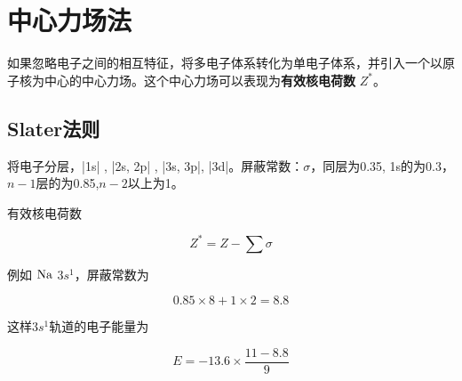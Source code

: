 \section{中心力场法}

如果忽略电子之间的相互特征，将多电子体系转化为单电子体系，并引入一个以原子核为中心的中心力场。这个中心力场可以表现为\textbf{有效核电荷数} $Z^*$。

\subsection{Slater法则}

将电子分层，|1s| , |2s, 2p| , |3s, 3p|, |3d|。屏蔽常数：$\sigma$，同层为0.35, 1s的为0.3，$n - 1$层的为0.85,$n - 2$以上为1。

有效核电荷数

\begin{equation*}
	Z^* = Z - \sum \sigma
\end{equation*}

例如 $\ce{Na}$ $3s^1$，屏蔽常数为

\begin{equation*}
	0.85 \times 8 + 1 \times 2 = 8.8
\end{equation*}

这样$3s^1$轨道的电子能量为

\begin{equation*}
	E = -13.6 \times \frac{11 - 8.8}{9}
\end{equation*}
